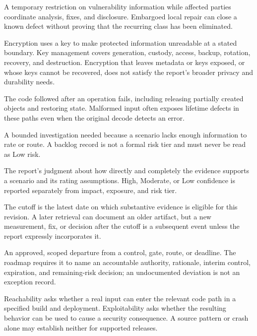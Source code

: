 \documentclass[../main.tex]{subfiles}
\begin{document}
\begin{description}[leftmargin=1.5em,style=nextline]
\item[Embargo.]
A temporary restriction on vulnerability information while affected parties
coordinate analysis, fixes, and disclosure. Embargoed local repair can close a
known defect without proving that the recurring class has been eliminated.

\item[Encryption / key management.]
Encryption uses a key to make protected information unreadable at a stated
boundary. Key management covers generation, custody, access, backup, rotation,
recovery, and destruction. Encryption that leaves metadata or keys exposed, or
whose keys cannot be recovered, does not satisfy the report's broader privacy
and durability needs.

\item[Error path / cleanup / unwinding.]
The code followed after an operation fails, including releasing partially
created objects and restoring state. Malformed input often exposes lifetime
defects in these paths even when the original decode detects an error.

\item[Evidence action / evidence backlog.]
A bounded investigation needed because a scenario lacks enough information to
rate or route. A backlog record is not a formal risk tier and must never be
read as Low risk.

\item[Evidence confidence.]
The report's judgment about how directly and completely the evidence supports
a scenario and its rating assumptions. High, Moderate, or Low confidence is
reported separately from impact, exposure, and risk tier.

\item[Evidence cutoff / subsequent-event update.]
The cutoff is the latest date on which substantive evidence is eligible for
this revision. A later retrieval can document an older artifact, but a new
measurement, fix, or decision after the cutoff is a subsequent event unless
the report expressly incorporates it.

\item[Exception / variance.]
An approved, scoped departure from a control, gate, route, or deadline. The
roadmap requires it to name an accountable authority, rationale, interim
control, expiration, and remaining-risk decision; an undocumented deviation is
not an exception record.

\item[Exploitability / reachability.]
Reachability asks whether a real input can enter the relevant code path in a
specified build and deployment. Exploitability asks whether the resulting
behavior can be used to cause a security consequence. A source pattern or
crash alone may establish neither for supported releases.


\end{description}
\end{document}
